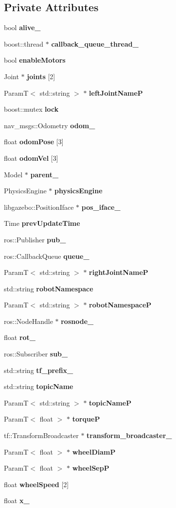 \subsection*{Private Attributes}
\begin{DoxyCompactItemize}
\item 
bool {\bf alive\_\-}
\item 
boost::thread $\ast$ {\bf callback\_\-queue\_\-thread\_\-}
\item 
bool {\bf enableMotors}
\item 
Joint $\ast$ {\bf joints} [2]
\item 
ParamT$<$ std::string $>$ $\ast$ {\bf leftJointNameP}
\item 
boost::mutex {\bf lock}
\item 
nav\_\-msgs::Odometry {\bf odom\_\-}
\item 
float {\bf odomPose} [3]
\item 
float {\bf odomVel} [3]
\item 
Model $\ast$ {\bf parent\_\-}
\item 
PhysicsEngine $\ast$ {\bf physicsEngine}
\item 
libgazebo::PositionIface $\ast$ {\bf pos\_\-iface\_\-}
\item 
Time {\bf prevUpdateTime}
\item 
ros::Publisher {\bf pub\_\-}
\item 
ros::CallbackQueue {\bf queue\_\-}
\item 
ParamT$<$ std::string $>$ $\ast$ {\bf rightJointNameP}
\item 
std::string {\bf robotNamespace}
\item 
ParamT$<$ std::string $>$ $\ast$ {\bf robotNamespaceP}
\item 
ros::NodeHandle $\ast$ {\bf rosnode\_\-}
\item 
float {\bf rot\_\-}
\item 
ros::Subscriber {\bf sub\_\-}
\item 
std::string {\bf tf\_\-prefix\_\-}
\item 
std::string {\bf topicName}
\item 
ParamT$<$ std::string $>$ $\ast$ {\bf topicNameP}
\item 
ParamT$<$ float $>$ $\ast$ {\bf torqueP}
\item 
tf::TransformBroadcaster $\ast$ {\bf transform\_\-broadcaster\_\-}
\item 
ParamT$<$ float $>$ $\ast$ {\bf wheelDiamP}
\item 
ParamT$<$ float $>$ $\ast$ {\bf wheelSepP}
\item 
float {\bf wheelSpeed} [2]
\item 
float {\bf x\_\-}
\end{DoxyCompactItemize}


